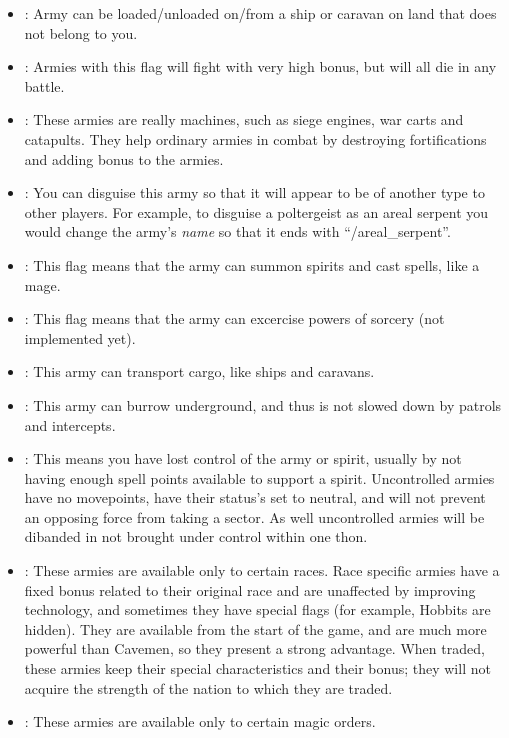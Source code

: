 \begin{itemize}
\item
{}: Army can be loaded/unloaded on/from a ship or
caravan on land that does not belong to you.
\item
{}: Armies with this flag will fight with very high bonus,
but will all die in any battle.
\item
{}: These armies are really machines, such as siege engines,
war carts and catapults.  They help ordinary armies in combat by
destroying fortifications and adding bonus to the armies.
\item
{}: You can disguise this army so that it will appear to be
of another type to other players.  For example, to disguise a
poltergeist as an areal serpent you would change the army's
{\em name} so that it ends with ``/areal_serpent''.
\item
{}: This flag means that the army can summon spirits
and cast spells, like a mage.
\item
{}: This flag means that the army can excercise powers
of sorcery (not implemented yet).
\item
{}: This army can transport cargo, like ships and caravans.
\item
{}: This army can burrow underground, and thus is not
slowed down by patrols and intercepts.
\item
{}: This means you have lost control of the army or
spirit, usually by not having enough spell points available to support
a spirit.  Uncontrolled armies have no movepoints, have their status's
set to neutral, and will not prevent an opposing force from taking a
sector.  As well uncontrolled armies will be dibanded in not brought
under control within one thon.
\item
{}: These armies are available only to certain races.
Race specific armies have a fixed bonus related to their original race
and are unaffected by improving technology, and sometimes they have
special flags (for example, Hobbits are hidden).  They are available
from the start of the game, and are much more powerful than Cavemen,
so they present a strong advantage.  When traded, these armies keep
their special characteristics and their bonus; they will not acquire
the strength of the nation to which they are traded.
\item
{}: These armies are available only to certain
magic orders.
\end{itemize}

